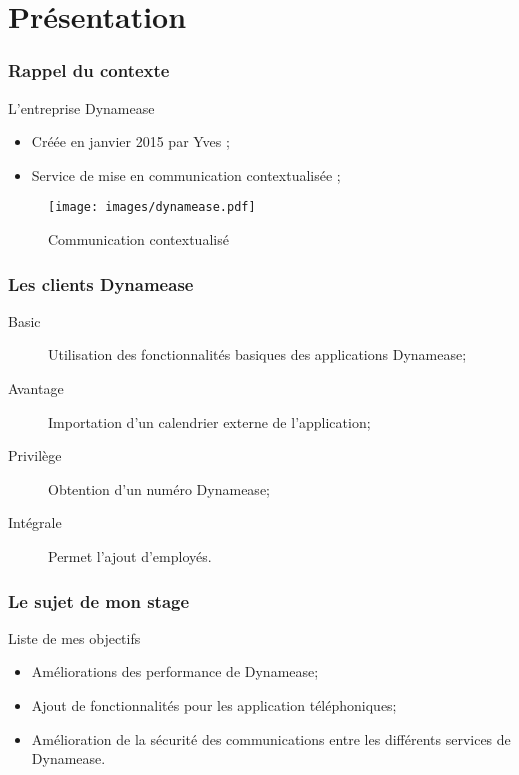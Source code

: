 \section{Présentation}
\author{Kévin Moreau}


\begin{frame}
	\frametitle{Rappel du contexte}

	\begin{block}{L'entreprise Dynamease}
	 \begin{itemize}
      \item Créée en janvier 2015 par Yves  ;
	  \item Service de mise en communication contextualisée ;
	 \end{itemize}
	\end{block}

    \begin{center}
	  \begin{figure}
        \texttt{[image: images/dynamease.pdf]}
	   \caption{Communication contextualisé}
	  \end{figure}
	\end{center}
\end{frame}

\begin{frame}
	\frametitle{Les clients Dynamease}

    \begin{description}
    	\item[Basic] Utilisation des fonctionnalités basiques des applications Dynamease;
    	\item[Avantage] Importation d'un calendrier externe de l'application;
    	\item[Privilège] Obtention d'un numéro Dynamease;
    	\item[Intégrale] Permet l'ajout d'employés.
    \end{description}

\end{frame}

\begin{frame}
	\frametitle{Le sujet de mon stage}

	\begin{block}{Liste de mes objectifs}
	 \begin{itemize}
	  \item Améliorations des performance de Dynamease;
      \item Ajout de fonctionnalités pour les application téléphoniques;
	  \item Amélioration de la sécurité des communications entre les différents services de Dynamease.
	 \end{itemize}
	\end{block}

\end{frame}

